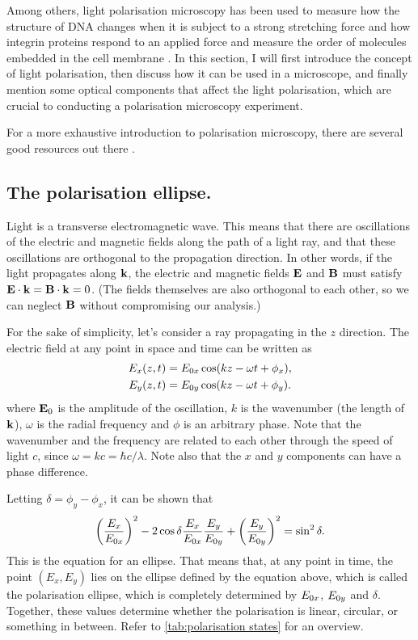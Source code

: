 Among others, light polarisation microscopy has been used to measure how the structure of DNA changes when it is subject to a strong stretching force and how integrin proteins respond to an applied force and measure the order of molecules embedded in the cell membrane \cite{Backer2019, Nordenfelt2017, Swaminathan2017, Brasselet2013}. In this section, I will first introduce the concept of light polarisation, then discuss how it can be used in a microscope, and finally mention some optical components that affect the light polarisation, which are crucial to conducting a polarisation microscopy experiment.

For a more exhaustive introduction to polarisation microscopy, there are several good resources out there \cite{Goldstein2011, Collett2005, Lakowicz2006}.

\subsection{The polarisation ellipse.} Light is a transverse electromagnetic wave. This means that there are oscillations of the electric and magnetic fields along the path of a light ray, and that these oscillations are orthogonal to the propagation direction. In other words, if the light propagates along $\vb{k}$, the electric and magnetic fields $\vb{E}$ and $\vb{B}$ must satisfy $ \vb{E} \cdot \vb{k} = \vb{B} \cdot \vb{k} = 0$. (The fields themselves are also orthogonal to each other, so we can neglect $ \vb{B} $ without compromising our analysis.)

For the sake of simplicity, let's consider a ray propagating in the $ z $ direction. The electric field at any point in space and time can be written as
\begin{align}
	E_x(z, t) &= E_{0x} \cos(kz-\omega t + \phi_x),\\
	E_y(z, t) &= E_{0y} \cos(kz-\omega t + \phi_y).
\end{align}
where $ \vb{E}_0 $ is the amplitude of the oscillation, $ k $ is the wavenumber (the length of $ \vb{k} $), $ \omega $ is the radial frequency and $ \phi $ is an arbitrary phase. Note that the wavenumber and the frequency are related to each other through the speed of light $ c $, since $ \omega = kc = \hbar c/\lambda$. Note also that the $ x $ and $ y $ components can have a phase difference.

Letting $ \delta = \phi_y-\phi_x $, it can be shown that 
\begin{equation}
	\left(\frac{E_x}{E_{0x}}\right)^2 - 2\cos\delta\frac{E_x}{E_{0x}}\frac{E_y}{E_{0y}} + \left(\frac{E_y}{E_{0y}}\right)^2 = \sin^2\delta.
\end{equation}
This is the equation for an ellipse. That means that, at any point in time, the point $ (E_x, E_y) $ lies on the ellipse defined by the equation above, which is called the polarisation ellipse, which is completely determined by $ E_{0x} $, $ E_{0y} $ and $ \delta $. Together, these values determine whether the polarisation is linear, circular, or something in between. Refer to \autoref{tab:polarisation states} for an overview.

